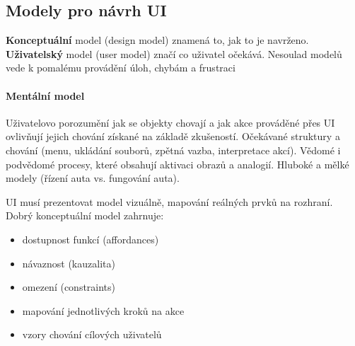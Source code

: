 \subsection{Modely pro návrh UI}
\textbf{Konceptuální} model (design model) znamená to, jak to je navrženo. \textbf{Uživatelský} model (user model) značí co uživatel očekává. Nesoulad modelů vede k pomalému provádění úloh, chybám a frustraci

\paragraph{Mentální model} Uživatelovo porozumění jak se objekty chovají a jak akce prováděné přes UI ovlivňují jejich chování získané na základě zkušeností. Očekávané struktury a chování (menu, ukládání souborů, zpětná vazba, interpretace akcí). Vědomé i podvědomé procesy, které obsahují aktivaci obrazů a analogií. Hluboké a mělké modely (řízení auta vs. fungování auta).

UI musí prezentovat model vizuálně, mapování reálných prvků na rozhraní. Dobrý konceptuální model zahrnuje:
\begin{itemize}[itemsep=0px]
\item dostupnost funkcí (affordances)
\item návaznost (kauzalita)
\item omezení (constraints)
\item mapování jednotlivých kroků na akce
\item vzory chování cílových uživatelů
\end{itemize}
